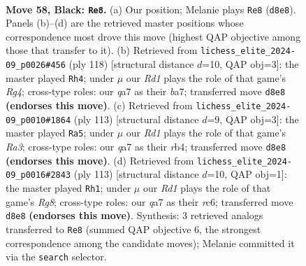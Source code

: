 \documentclass[11pt]{article}
\begin{document}
\clearpage

\begin{figure}[p]\centering
\begin{subfigure}{0.46\textwidth}\centering
\resizebox{\linewidth}{!}{%
\newchessgame
\chessboard[
  setfen={3r4/Q7/3k4/6P1/4P2P/8/1K6/8 b - - 2 58},
  showmover=false,
  pgfstyle=straightmove, color=movearrow, markmove={d8-e8}
]}
\caption{}
\end{subfigure}\hfill
\begin{subfigure}{0.46\textwidth}\centering
\resizebox{\linewidth}{!}{%
\newchessgame
\chessboard[
  setfen={8/b7/P1p2k2/8/4K1R1/7p/8/8 w - - 0 60},
  showmover=false,
  pgfstyle=straightmove, color=movearrow, markmove={g4-h4}
]}
\caption{}
\end{subfigure}
\\[4pt]
\begin{subfigure}{0.46\textwidth}\centering
\resizebox{\linewidth}{!}{%
\newchessgame
\chessboard[
  setfen={8/8/r1k5/5PP1/1R6/8/4K3/8 b - - 0 57},
  showmover=false,
  pgfstyle=straightmove, color=movearrow, markmove={a6-a5}
]}
\caption{}
\end{subfigure}\hfill
\begin{subfigure}{0.46\textwidth}\centering
\resizebox{\linewidth}{!}{%
\newchessgame
\chessboard[
  setfen={8/6k1/2R5/5K1P/8/5P2/8/6r1 b - - 10 57},
  showmover=false,
  pgfstyle=straightmove, color=movearrow, markmove={g1-h1}
]}
\caption{}
\end{subfigure}
\caption{\textbf{Move 58, Black: \texttt{Re8}.} (a) Our position; Melanie plays \texttt{Re8} (\texttt{d8e8}). Panels (b)--(d) are the retrieved master positions whose correspondence most drove this move (highest QAP objective among those that transfer to it). (b) Retrieved from \texttt{lichess\_elite\_2024-09\_p0026\#456} (ply 118) [structural distance $d$=10, QAP obj=3]: the master played \texttt{Rh4}; under $\mu$ our \emph{Rd1} plays the role of that game's \emph{Rg4}; cross-type roles: our \emph{q}a7 as their \emph{b}a7; transferred move \texttt{d8e8} \textbf{(endorses this move)}. (c) Retrieved from \texttt{lichess\_elite\_2024-09\_p0010\#1864} (ply 113) [structural distance $d$=9, QAP obj=3]: the master played \texttt{Ra5}; under $\mu$ our \emph{Rd1} plays the role of that game's \emph{Ra3}; cross-type roles: our \emph{q}a7 as their \emph{r}b4; transferred move \texttt{d8e8} \textbf{(endorses this move)}. (d) Retrieved from \texttt{lichess\_elite\_2024-09\_p0016\#2843} (ply 113) [structural distance $d$=10, QAP obj=1]: the master played \texttt{Rh1}; under $\mu$ our \emph{Rd1} plays the role of that game's \emph{Rg8}; cross-type roles: our \emph{q}a7 as their \emph{r}c6; transferred move \texttt{d8e8} \textbf{(endorses this move)}. Synthesis: 3 retrieved analogs transferred to \texttt{Re8} (summed QAP objective 6, the strongest correspondence among the candidate moves); Melanie committed it via the \texttt{search} selector.}
\label{fig:thought-m115}
\end{figure}
\end{document}
